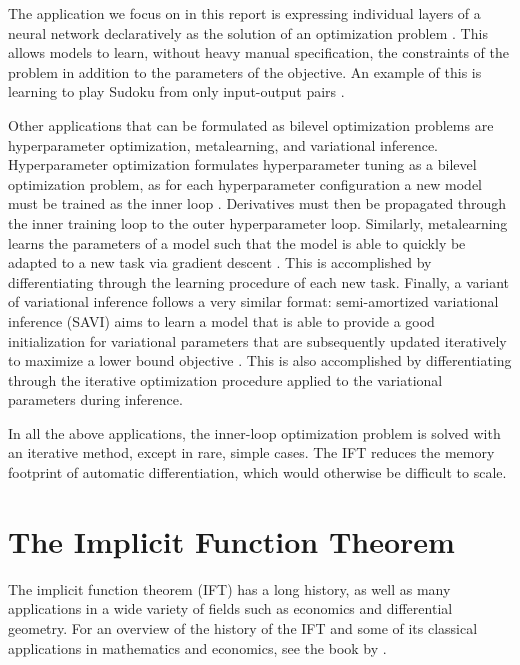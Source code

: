 \documentclass[11pt]{article}
\begin{document}
The application we focus on in this report is expressing individual layers of a neural network declaratively
as the solution of an optimization problem \citep{optnet,agrawal2019diffcvx,gould2019declarative}.
This allows models to learn, without heavy manual specification, the constraints of the problem
in addition to the parameters of the objective.
An example of this is learning to play Sudoku from only input-output pairs \citep{optnet}.

Other applications that can be formulated as bilevel optimization problems are
hyperparameter optimization, metalearning, and variational inference.
Hyperparameter optimization formulates hyperparameter tuning as a bilevel optimization problem,
as for each hyperparameter configuration a new model must be trained as the inner loop
\citep{maclaurin2015reversible,lorraine2019implasso,lorraine2019hoift,bertrand2020implicit}.
Derivatives must then be propagated through the inner training loop to the outer hyperparameter
loop.
Similarly, metalearning learns the parameters of a model such that the model is able to quickly
be adapted to a new task via gradient descent \citep{finn2017maml,rajeswaran2019imaml}.
This is accomplished by differentiating through the learning procedure of each new task.
Finally, a variant of variational inference follows a very similar format:
semi-amortized variational inference (SAVI) aims to learn a model that is able to provide
a good initialization for variational parameters that are subsequently updated iteratively
to maximize a lower bound objective \citep{kim2018savi}.
This is also accomplished by differentiating through the iterative optimization procedure
applied to the variational parameters during inference.

In all the above applications, the inner-loop optimization problem is solved
with an iterative method, except in rare, simple cases.
The IFT reduces the memory footprint of automatic differentiation,
which would otherwise be difficult to scale.

\section{The Implicit Function Theorem}
The implicit function theorem (IFT) has a long history, as well as many applications
in a wide variety of fields such as economics and differential geometry.
For an overview of the history of the IFT and some of its classical applications
in mathematics and economics,
see the book by \citet{iftbook}.
\end{document}

